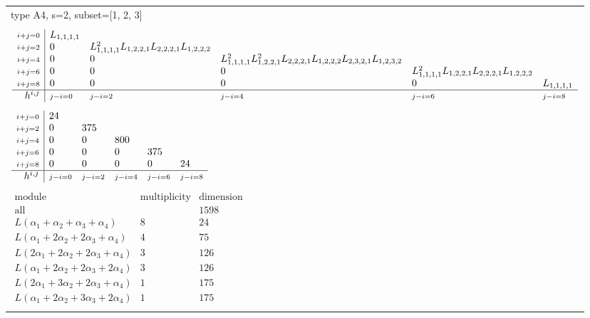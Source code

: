 \documentclass[crop,border=2mm]{standalone}
\begin{document}
\begin{tabular}{l}
{\huge type A4, s=2, subset=[1, 2, 3]}\\ \\


$\displaystyle
\begin{array}{r|l l l l l}
	{\scriptstyle i+j=0}&L_{1,1,1,1}&&&&\\
	{\scriptstyle i+j=2}&0&L_{1,1,1,1}^{2}L_{1,2,2,1}L_{2,2,2,1}L_{1,2,2,2}&&&\\
	{\scriptstyle i+j=4}&0&0&L_{1,1,1,1}^{2}L_{1,2,2,1}^{2}L_{2,2,2,1}L_{1,2,2,2}L_{2,3,2,1}L_{1,2,3,2}&&\\
	{\scriptstyle i+j=6}&0&0&0&L_{1,1,1,1}^{2}L_{1,2,2,1}L_{2,2,2,1}L_{1,2,2,2}&\\
	{\scriptstyle i+j=8}&0&0&0&0&L_{1,1,1,1}\\
	\hline h^{i,j}&{\scriptstyle j-i=0}&{\scriptstyle j-i=2}&{\scriptstyle j-i=4}&{\scriptstyle j-i=6}&{\scriptstyle j-i=8}
\end{array}
$ \\ \\


$\displaystyle
\begin{array}{r|l l l l l}
	{\scriptstyle i+j=0}&24&&&&\\
	{\scriptstyle i+j=2}&0&375&&&\\
	{\scriptstyle i+j=4}&0&0&800&&\\
	{\scriptstyle i+j=6}&0&0&0&375&\\
	{\scriptstyle i+j=8}&0&0&0&0&24\\
	\hline h^{i,j}&{\scriptstyle j-i=0}&{\scriptstyle j-i=2}&{\scriptstyle j-i=4}&{\scriptstyle j-i=6}&{\scriptstyle j-i=8}
\end{array}
$ \\ \\


$\displaystyle
\begin{array}{rll}
	\text{module}&\text{multiplicity}&\text{dimension} \\ \hline \text{all}&&1598 \\
	L\left(\alpha_{1}+\alpha_{2}+\alpha_{3}+\alpha_{4}\right)&8&24\\
	L\left(\alpha_{1}+ 2\alpha_{2}+ 2\alpha_{3}+\alpha_{4}\right)&4&75\\
	L\left( 2\alpha_{1}+ 2\alpha_{2}+ 2\alpha_{3}+\alpha_{4}\right)&3&126\\
	L\left(\alpha_{1}+ 2\alpha_{2}+ 2\alpha_{3}+ 2\alpha_{4}\right)&3&126\\
	L\left( 2\alpha_{1}+ 3\alpha_{2}+ 2\alpha_{3}+\alpha_{4}\right)&1&175\\
	L\left(\alpha_{1}+ 2\alpha_{2}+ 3\alpha_{3}+ 2\alpha_{4}\right)&1&175
\end{array}
$ \\ \\

\end{tabular}
\end{document}
